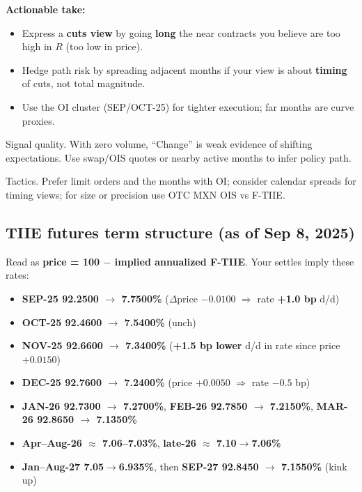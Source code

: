 \documentclass[10pt,a4paper]{article} %
\begin{document}
\textbf{Actionable take:}
\begin{itemize}
  \item Express a \textbf{cuts view} by going \textbf{long} the near contracts you believe are too high in $R$ (too low in price).
  \item Hedge path risk by spreading adjacent months if your view is about \textbf{timing} of cuts, not total magnitude.
  \item Use the OI cluster (SEP/OCT-25) for tighter execution; far months are curve proxies.
\end{itemize}

Signal quality. With zero volume, “Change” is weak evidence of shifting expectations. Use swap/OIS quotes or nearby active months to infer policy path.

Tactics. Prefer limit orders and the months with OI; consider calendar spreads for timing views; for size or precision use OTC MXN OIS vs F-TIIE.



\subsection{TIIE futures term structure (as of Sep 8, 2025)}


Read as \textbf{price = 100 $-$ implied annualized F-TIIE}. Your settles imply these rates:

\begin{itemize}
  \item \textbf{SEP-25 92.2500 $\rightarrow$ 7.7500\%} ($\Delta$price $-0.0100$ $\Rightarrow$ rate \textbf{+1.0 bp} d/d)
  \item \textbf{OCT-25 92.4600 $\rightarrow$ 7.5400\%} (unch)
  \item \textbf{NOV-25 92.6600 $\rightarrow$ 7.3400\%} (\textbf{+1.5 bp lower} d/d in rate since price $+0.0150$)
  \item \textbf{DEC-25 92.7600 $\rightarrow$ 7.2400\%} (price $+0.0050$ $\Rightarrow$ rate $-0.5$ bp)
  \item \textbf{JAN-26 92.7300 $\rightarrow$ 7.2700\%}, \textbf{FEB-26 92.7850 $\rightarrow$ 7.2150\%}, \textbf{MAR-26 92.8650 $\rightarrow$ 7.1350\%}
  \item \textbf{Apr--Aug-26 $\approx$ 7.06--7.03\%}, \textbf{late-26 $\approx$ 7.10$\rightarrow$7.06\%}
  \item \textbf{Jan--Aug-27 7.05$\rightarrow$6.935\%}, then \textbf{SEP-27 92.8450 $\rightarrow$ 7.1550\%} (kink up)
\end{itemize}
\end{document}
